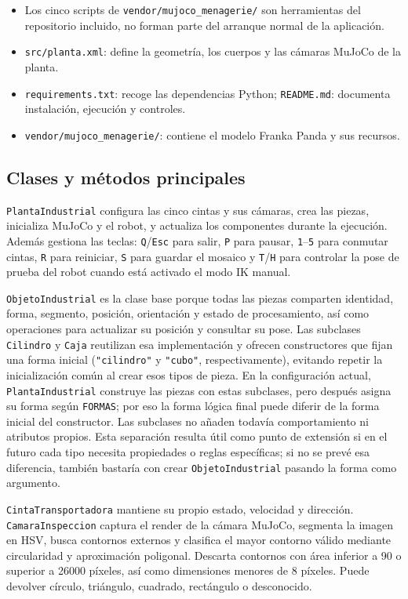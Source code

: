 \documentclass[12pt,a4paper]{article}
\begin{document}
\begin{itemize}
    \item Los cinco scripts de \texttt{vendor/mujoco\_menagerie/} son herramientas del repositorio incluido, no forman parte del arranque normal de la aplicación.
    \item \texttt{src/planta.xml}: define la geometría, los cuerpos y las cámaras MuJoCo de la planta.
    \item \texttt{requirements.txt}: recoge las dependencias Python; \texttt{README.md}: documenta instalación, ejecución y controles.
    \item \texttt{vendor/mujoco\_menagerie/}: contiene el modelo Franka Panda y sus recursos.
\end{itemize}

\subsection{Clases y métodos principales}

\texttt{PlantaIndustrial} configura las cinco cintas y sus cámaras, crea las
piezas, inicializa MuJoCo y el robot, y actualiza los componentes durante la
ejecución. Además gestiona las teclas: \texttt{Q}/\texttt{Esc} para salir,
\texttt{P} para pausar, \texttt{1}--\texttt{5} para conmutar cintas,
\texttt{R} para reiniciar, \texttt{S} para guardar el mosaico y
\texttt{T}/\texttt{H} para controlar la pose de prueba del robot cuando está
activado el modo IK manual.

\texttt{ObjetoIndustrial} es la clase base porque todas las piezas comparten
identidad, forma, segmento, posición, orientación y estado de procesamiento, así
como operaciones para actualizar su posición y consultar su pose. Las subclases
\texttt{Cilindro} y \texttt{Caja} reutilizan esa implementación y ofrecen
constructores que fijan una forma inicial (\texttt{"cilindro"} y
\texttt{"cubo"}, respectivamente), evitando repetir la inicialización común al
crear esos tipos de pieza. En la configuración actual, \texttt{PlantaIndustrial}
construye las piezas con estas subclases, pero después asigna su forma según
\texttt{FORMAS}; por eso la forma lógica final puede diferir de la forma inicial
del constructor. Las subclases no añaden todavía comportamiento ni atributos
propios. Esta separación resulta útil como punto de extensión si en el futuro
cada tipo necesita propiedades o reglas específicas; si no se prevé esa
diferencia, también bastaría con crear \texttt{ObjetoIndustrial} pasando la
forma como argumento.

\texttt{CintaTransportadora} mantiene su propio estado, velocidad y dirección.
\texttt{CamaraInspeccion} captura el render de la cámara MuJoCo, segmenta la
imagen en HSV, busca contornos externos y clasifica el mayor contorno válido
mediante circularidad y aproximación poligonal. Descarta contornos con área
inferior a 90 o superior a 26000 píxeles, así como dimensiones menores de 8
píxeles. Puede devolver círculo, triángulo, cuadrado, rectángulo o
desconocido.
\end{document}

